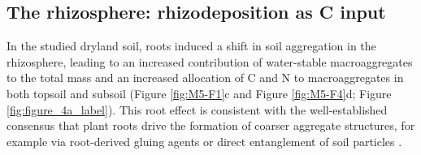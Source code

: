 \subsection{The rhizosphere: rhizodeposition as C input}

In the studied dryland soil, roots induced a shift in soil aggregation in the rhizosphere, leading to an increased contribution of water-stable macroaggregates to the total mass and an increased allocation of C and N to macroaggregates in both topsoil and subsoil (Figure \ref{fig:M5-F1}c and Figure \ref{fig:M5-F4}d; Figure \ref{fig:figure_4a_label}). This root effect is consistent with the well-established consensus that plant roots drive the formation of coarser aggregate structures, for example via root-derived gluing agents or direct entanglement of soil particles \citep{Tisdall1982, Six2004, Angst2018, Gregory2022}.

